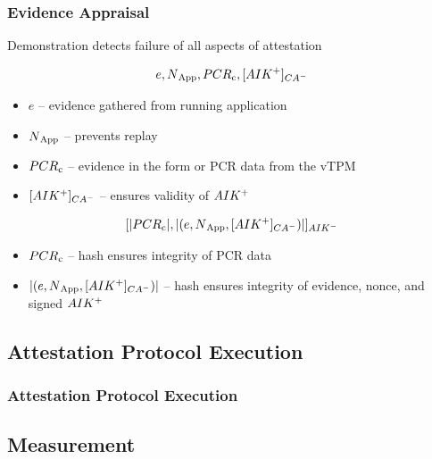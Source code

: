 \documentclass{beamer}
\def \app {App}
\def \pcomp {PCR\textsubscript{c}}
\def \eve {e}
\def \cacert {\sign {\public{AIK}}{CA}}
\def \exdata {\hash{(\eve, \nonce{\app}, \cacert ) }}
\begin{document}
\begin{frame}
  \frametitle{Evidence Appraisal}

  \begin{center}
    {\color{kublue}Demonstration detects failure of all aspects of attestation}
  \end{center}

  \[\eve, \nonce{\app}, \pcomp, \cacert\]

  \begin{itemize}
  \item $\eve$ -- evidence gathered from running application
  \item $\nonce{\app}$ -- prevents replay
  \item $\pcomp$ -- evidence in the form or PCR data from the vTPM
  \item $\cacert$ -- ensures validity of $AIK^{+}$
  \end{itemize}

  \[\sign{\hash{\pcomp}, \exdata}{AIK}\]

  \begin{itemize}
  \item $\pcomp$ -- hash ensures integrity of PCR data
  \item $\exdata$ -- hash ensures integrity of evidence, nonce, and
    signed $AIK^{+}$
  \end{itemize}

\end{frame}

\subsection{Attestation Protocol Execution}

\begin{frame}
  \frametitle{Attestation Protocol Execution}
\end{frame}

\subsection{Measurement}
\end{document}
